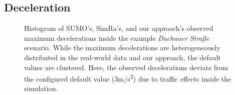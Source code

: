 \subsection{Deceleration}
\label{subsec:deceleration_evaluation}
\begin{figure}
    \centering
    \hfill
    \caption{%
        Histogram of SUMO's, SimRa's, and our approach's observed maximum decelerations inside the example \textit{Dachauer Straße} scenario.
        While the maximum decelerations are heterogeneously distributed in the real-world data and our approach, the default values are clustered.
        Here, the observed decelerations deviate from the configured default value (3m/s\textsuperscript{2}) due to traffic effects inside the simulation.
    }%
    \label{fig:eval_dec}
\end{figure}

